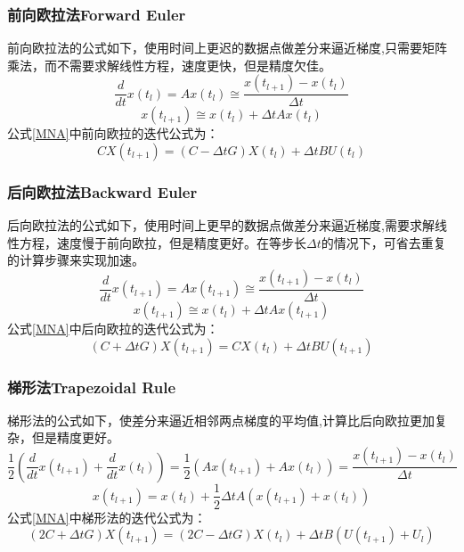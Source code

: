 \documentclass[12pt]{article}
\begin{document}
\subsubsection{前向欧拉法Forward Euler}
前向欧拉法的公式如下，使用时间上更迟的数据点做差分来逼近梯度,只需要矩阵乘法，而不需要求解线性方程，速度更快，但是精度欠佳。
\begin{equation}
\frac{d}{d t} x\left(t_l\right)=A x\left(t_l\right) \cong \frac{x\left(t_{l+1}\right)-x\left(t_l\right)}{\Delta t}
\end{equation}
\begin{equation}
x\left(t_{l+1}\right) \cong x\left(t_l\right)+\Delta t A x\left(t_l\right)
\end{equation}
公式\ref{MNA}中前向欧拉的迭代公式为：
\begin{equation}
    CX(t_{l+1}) = (C-\Delta tG)X(t_{l}) + \Delta t BU(t_{l})
\end{equation}


\subsubsection{后向欧拉法Backward Euler}
后向欧拉法的公式如下，使用时间上更早的数据点做差分来逼近梯度,需要求解线性方程，速度慢于前向欧拉，但是精度更好。在等步长$\Delta t$的情况下，可省去重复的计算步骤来实现加速。
\begin{equation}
\frac{d}{d t} x\left(t_{l+1}\right)=A x\left(t_{l+1}\right) \cong \frac{x\left(t_{l+1}\right)-x\left(t_l\right)}{\Delta t}
\end{equation}
\begin{equation}
x\left(t_{l+1}\right) \cong x\left(t_l\right)+\Delta t A x\left(t_{l+1}\right)
\end{equation}
公式\ref{MNA}中后向欧拉的迭代公式为：
\begin{equation}
    (C+\Delta tG)X(t_{l+1}) = CX(t_{l}) + \Delta t BU(t_{l+1})
\end{equation}


\subsubsection{梯形法Trapezoidal Rule}
梯形法的公式如下，使差分来逼近相邻两点梯度的平均值,计算比后向欧拉更加复杂，但是精度更好。
\begin{equation}
  \frac{1}{2}\left(\frac{d}{d t} x\left(t_{l+1}\right)+\frac{d}{d t} x\left(t_l\right)\right)
  =\frac{1}{2}\left(A x\left(t_{l+1}\right)+A x\left(t_l\right)\right)
  =\frac{x\left(t_{l+1}\right)-x\left(t_l\right)}{\Delta t}
\end{equation}
\begin{equation}
  x\left(t_{l+1}\right)=x\left(t_l\right)+\frac{1}{2} \Delta t A\left(x\left(t_{l+1}\right)+x\left(t_l\right)\right)
\end{equation}
公式\ref{MNA}中梯形法的迭代公式为：
\begin{equation}
    (2C+\Delta tG)X(t_{l+1}) = (2C-\Delta tG)X(t_{l}) + \Delta t B(U(t_{l+1}) + U_{l})
\end{equation}
\end{document}
